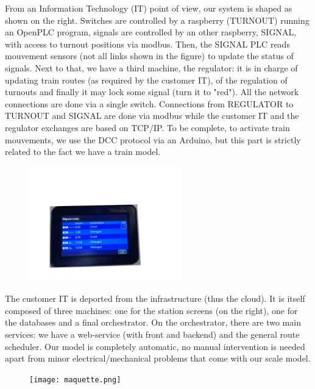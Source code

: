\documentclass[runningheads]{llncs}
\begin{document}
From an Information Technology (IT) point of view, our system is shaped as shown on the right. Switches are controlled by a raspberry (TURNOUT) running an OpenPLC program, signals are controlled by an other raspberry, SIGNAL, with access to turnout positions via modbus. Then, the SIGNAL PLC reads mouvement sensors  (not all links shown in the figure) to update the status of signals. Next to that, we have a third machine, the regulator: it is in charge of updating train routes (as required by the customer IT),  of the regulation of turnouts and finally it may lock some signal (turn it to "red"). All the network connections are done via a single switch. Connections from REGULATOR to TURNOUT and SIGNAL are done via modbus while the customer IT and the regulator exchanges  are based on TCP/IP.  To be complete, to activate train mouvements, we use the DCC protocol via an Arduino, but this part is strictly related to the fact we have a train model. 


\begin{figure}
\hspace{-10mm}
 \begin{minipage}{0.3\textwidth}
        \centering
        \vspace{-24mm}
\includegraphics[height=50mm]{ZoomAffichage.png}
    \end{minipage}
\end{figure}

 The customer IT is deported from the infrastructure (thus the cloud).  It is itself composed of three machines: one for the station screens (on the right), one for the databases and a final orchestrator. On the orchestrator, there are two main services: we have a web-service (with front and backend) and the general route scheduler.  Our model is completely automatic, no manual intervention is needed apart from minor electrical/mechanical problems that come with our scale model.
 
\begin{figure}
 \begin{minipage}{0.28\textwidth}
        \centering
        \vspace{-8mm}
\texttt{[image: maquette.png]}
    \end{minipage}
\end{figure}
\end{document}

